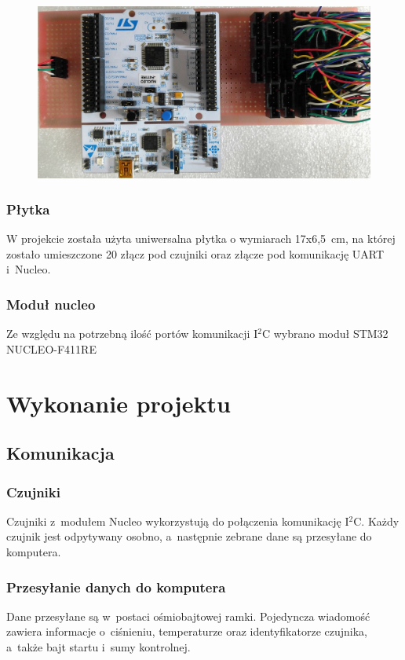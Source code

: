 \documentclass[a4paper,12pt]{article}
\begin{document}
			\begin{figure}[H]
		     	 \includegraphics[width=1\textwidth]{obrazy/plytka.jpg}
			\end{figure}
		
			\subsubsection{Płytka}
				W projekcie została użyta uniwersalna płytka o wymiarach 17x6,5~cm, na której zostało umieszczone 20 złącz pod czujniki oraz złącze pod komunikację UART i~Nucleo. 
						
			\subsubsection{Moduł nucleo}
				Ze względu na potrzebną ilość portów komunikacji I$^2$C wybrano moduł STM32 NUCLEO-F411RE
			
	\section{Wykonanie projektu}		
		\subsection{Komunikacja}
			\subsubsection{Czujniki}		
				Czujniki z~modułem Nucleo wykorzystują do połączenia komunikację I$^2$C. Każdy czujnik jest odpytywany osobno, a~następnie zebrane dane są przesyłane do komputera. 
			\subsubsection{Przesyłanie danych do komputera}
			Dane przesyłane są w~postaci ośmiobajtowej ramki. Pojedyncza wiadomość zawiera informacje o~ciśnieniu, temperaturze oraz identyfikatorze czujnika, a~także bajt startu i~sumy kontrolnej. %
\end{document}

